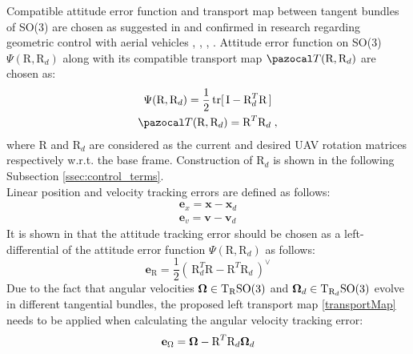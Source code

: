 Compatible attitude error function and transport map between tangent bundles of SO(3) are chosen as suggested in \cite{bulloBook} and confirmed in research regarding geometric control with aerial vehicles \cite{LeeClanak4}, \cite{LeeClanak3}, \cite{LeeClanak1}, \cite{LeeClanak2}. Attitude error function on SO(3) $	\Psi(\text{R}, \text{R}_d)$  along with its compatible transport map $\Ta(\text{R}, \text{R}_d)$ are chosen as:
\begin{gather}
	\Psi(\text{R}, \text{R}_d) = \frac{1}{2} \, \text{tr} [\, \text{I} - \text{R}_d^T\text{R} \,] \label{attErr} \\ 
	\Ta(\text{R}, \text{R}_d) = \text{R}^T \text{R}_d \label{transportMap} \;,
\end{gather}
where R and $\text{R}_d$ are considered as the current and desired UAV rotation matrices respectively w.r.t. the base frame. Construction of $\text{R}_d$ is shown in the following Subsection \ref{ssec:control_terms}. \\
Linear position and velocity tracking errors are defined as follows:
\begin{gather}
	\textbf{e}_x = \textbf{x} - \textbf{x}_d \\
	\textbf{e}_v = \textbf{v} - \textbf{v}_d \label{linear_error}
\end{gather}
It is shown in \cite{bulloBook} that the attitude tracking error should be chosen as a left-differential of the attitude error function $\Psi(\text{R}, \text{R}_d)$ as follows:
\begin{equation}
	\textbf{e}_\text{R} = \frac{1}{2} (\, \text{R}_d^T\text{R} - \text{R}^T\text{R}_d \,)^\vee
\end{equation}
Due to the fact that angular velocities $\boldsymbol{\Omega} \in \text{T}_\text{R} \text{SO}(3)$ and $\boldsymbol{\Omega}_d \in \text{T}_{\text{R}_d}\text{SO}(3)$ evolve in different tangential bundles, the proposed left transport map \eqref{transportMap} needs to be applied when calculating the angular velocity tracking error:
\begin{equation}
	\textbf{e}_\Omega = \boldsymbol{\Omega} - \text{R}^T\text{R}_d\boldsymbol{\Omega}_d \label{angular_error}
\end{equation}

